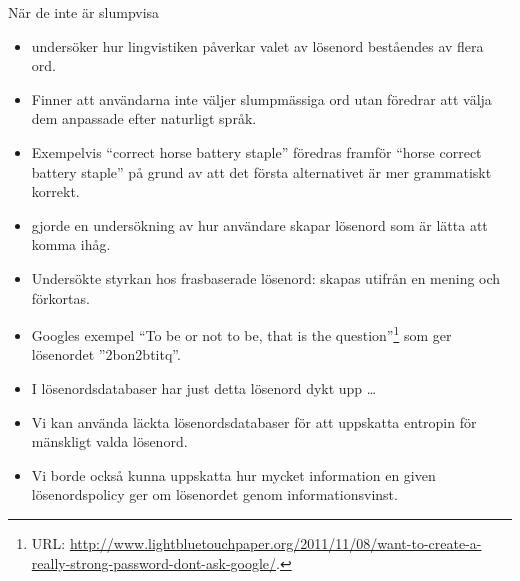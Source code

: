 \documentclass{beamer}
\theoremstyle{definition}
\begin{document}
\begin{frame}{\insertsubsectionhead}{När de inte är slumpvisa}
  \begin{itemize}
    \item \citet{Bonneau2012lpo} undersöker hur lingvistiken påverkar valet av 
      lösenord beståendes av flera ord.

    \item Finner att användarna inte väljer slumpmässiga ord utan föredrar att 
      välja dem anpassade efter naturligt språk.

    \item Exempelvis \enquote{correct horse battery staple} föredras framför 
      \enquote{horse correct battery staple} på grund av att det första 
      alternativet är mer grammatiskt korrekt.

  \end{itemize}
\end{frame}

\begin{frame}{\insertsubsectionhead}
  \begin{itemize}
    \item \citet{Kuo2006hso} gjorde en undersökning av hur användare skapar 
      lösenord som är lätta att komma ihåg.

    \item Undersökte styrkan hos frasbaserade lösenord:
      skapas utifrån en mening och förkortas.

    \item Googles exempel \enquote{To be or not to be, that is the 
        question}\footnote{%
        URL\@: 
        \protect\url{http://www.lightbluetouchpaper.org/2011/11/08/want-to-create-a-really-strong-password-dont-ask-google/}.
      } som ger lösenordet ''2bon2btitq''.

    \item I lösenordsdatabaser har just detta lösenord dykt upp \dots

  \end{itemize}
\end{frame}

\begin{frame}{\insertsubsectionhead}
  \begin{itemize}
    \item Vi kan använda läckta lösenordsdatabaser för att uppskatta entropin 
      för mänskligt valda lösenord.

    \item Vi borde också kunna uppskatta hur mycket information en given 
      lösenordspolicy ger om lösenordet genom informationsvinst.

  \end{itemize}
\end{frame}
\end{document}
